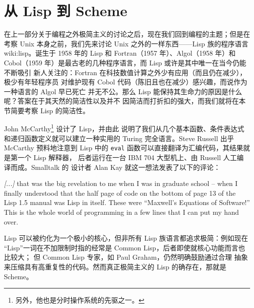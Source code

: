 \newpart
\section{从 Lisp 到 Scheme}\label{sec:lisp}

在上一部分关于编程之外极简主义的讨论之后，现在我们回到编程的主题；但是在考察
Unix 本身之前，我们先来讨论 Unix 之外的一样东西——Lisp 族的程序语言\cupercite%
{wiki:lisp}。诞生于 1958 年的 Lisp 和 Fortran（1957 年）、Algol（1958 年）和
Cobol（1959 年）是最古老的几种程序语言，而 Lisp 或许是其中唯一在当今仍能不断吸引
新人关注的：Fortran 在科技数值计算之外少有应用（而且仍在减少），极少有年轻程序员
对维护现有 Cobol 代码（陈旧且也在减少）感兴趣，而说作为一种语言的 Algol 早已死亡
并无不公。那么 Lisp 能保持其生命力的原因是什么呢？答案在于其天然的简洁性以及并不
因简洁而打折扣的强大，而我们就将在本节简要考察 Lisp 的简洁性。

John McCarthy\footnote{另外，他也是分时操作系统的先驱之一。} 设计了 Lisp，并由此
说明了我们从几个基本函数、条件表达式和递归函数定义就可以建立一种实用的 Turing
完全语言。Steve Russell 出乎 McCarthy 预料地注意到 Lisp
中的 \verb|eval| 函数可以直接翻译为汇编代码，其结果就是第一个 Lisp 解释器，
后者运行在一台 IBM 704 大型机上、由 Russell 人工编译而成。Smalltalk 的
设计者 Alan Kay 就这一想法发表了以下的评论：
\begin{quoting}
	\emph{[...]} that was the big revelation to me when I was in graduate
	school -- when I finally understood that the half page of code on the
	bottom of page 13 of the Lisp 1.5 manual was Lisp
	in itself.  These were ``Maxwell's Equations of Software!''  This is the
	whole world of programming in a few lines that I can put my hand over.
\end{quoting}
Lisp 可以被约化为一个极小的核心，但非所有 Lisp 族语言都追求极简：例如现在
“Lisp”一词在不加限制时指的经常是 Common Lisp，后者即使就核心功能而言也比较大；
但 Common Lisp 专家，如 Paul Graham，仍然明确鼓励通过合理
抽象来压缩具有高重复性的代码。然而真正极简主义的 Lisp 的确存在，那就是 Scheme。

